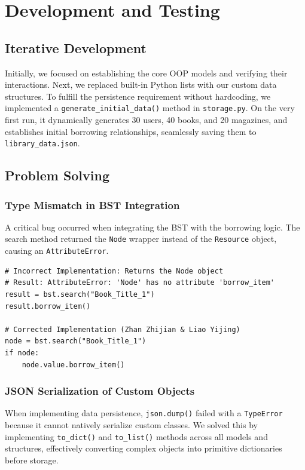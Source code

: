 \documentclass[11pt,a4paper]{article}
\begin{document}
\section{Development and Testing}
\label{sec:dev_testing}

\subsection{Iterative Development}
Initially, we focused on establishing the core OOP models and verifying their interactions. Next, we replaced built-in Python lists with our custom data structures. To fulfill the persistence requirement without hardcoding, we implemented a \texttt{generate\_initial\_data()} method in \texttt{storage.py}. On the very first run, it dynamically generates 30 users, 40 books, and 20 magazines, and establishes initial borrowing relationships, seamlessly saving them to \texttt{library\_data.json}.

\subsection{Problem Solving}
\subsubsection{Type Mismatch in BST Integration}
A critical bug occurred when integrating the BST with the borrowing logic. The search method returned the \texttt{Node} wrapper instead of the \texttt{Resource} object, causing an \texttt{AttributeError}. 

\begin{lstlisting}[caption={BST Search Fix: Accessing Value}]
# Incorrect Implementation: Returns the Node object
# Result: AttributeError: 'Node' has no attribute 'borrow_item'
result = bst.search("Book_Title_1")
result.borrow_item() 

# Corrected Implementation (Zhan Zhijian & Liao Yijing)
node = bst.search("Book_Title_1")
if node:
    node.value.borrow_item()
\end{lstlisting}

\subsubsection{JSON Serialization of Custom Objects}
When implementing data persistence, \texttt{json.dump()} failed with a \texttt{TypeError} because it cannot natively serialize custom classes. We solved this by implementing \texttt{to\_dict()} and \texttt{to\_list()} methods across all models and structures, effectively converting complex objects into primitive dictionaries before storage.
\end{document}
